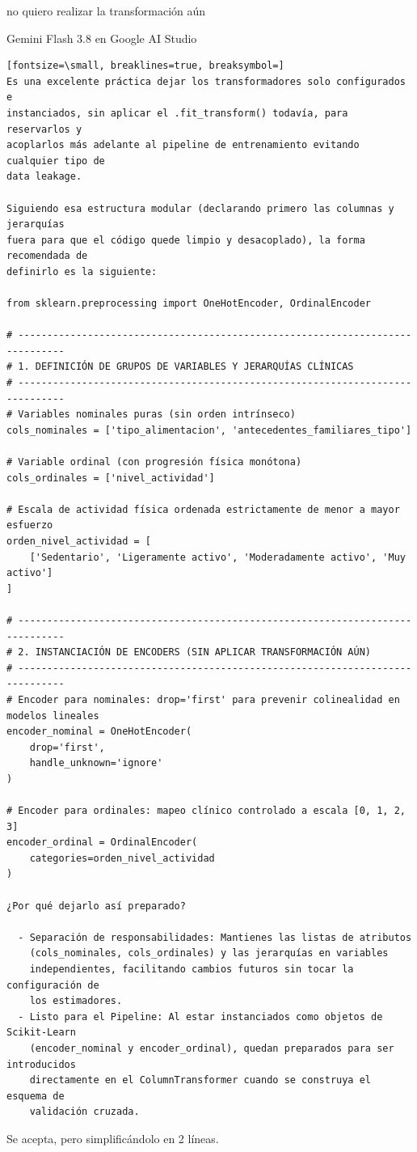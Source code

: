 \documentclass[12pt,a4paper,oneside]{book}
\begin{document}
\begin{iaprompt}
no quiero realizar la transformación aún
\end{iaprompt}
\begin{iaresp}{Gemini Flash 3.8 en Google AI Studio}
\begin{Verbatim}[fontsize=\small, breaklines=true, breaksymbol=]
Es una excelente práctica dejar los transformadores solo configurados e
instanciados, sin aplicar el .fit_transform() todavía, para reservarlos y
acoplarlos más adelante al pipeline de entrenamiento evitando cualquier tipo de
data leakage.

Siguiendo esa estructura modular (declarando primero las columnas y jerarquías
fuera para que el código quede limpio y desacoplado), la forma recomendada de
definirlo es la siguiente:

from sklearn.preprocessing import OneHotEncoder, OrdinalEncoder

# ------------------------------------------------------------------------------
# 1. DEFINICIÓN DE GRUPOS DE VARIABLES Y JERARQUÍAS CLÍNICAS
# ------------------------------------------------------------------------------
# Variables nominales puras (sin orden intrínseco)
cols_nominales = ['tipo_alimentacion', 'antecedentes_familiares_tipo']

# Variable ordinal (con progresión física monótona)
cols_ordinales = ['nivel_actividad']

# Escala de actividad física ordenada estrictamente de menor a mayor esfuerzo
orden_nivel_actividad = [
    ['Sedentario', 'Ligeramente activo', 'Moderadamente activo', 'Muy activo']
]

# ------------------------------------------------------------------------------
# 2. INSTANCIACIÓN DE ENCODERS (SIN APLICAR TRANSFORMACIÓN AÚN)
# ------------------------------------------------------------------------------
# Encoder para nominales: drop='first' para prevenir colinealidad en modelos lineales
encoder_nominal = OneHotEncoder(
    drop='first', 
    handle_unknown='ignore'
)

# Encoder para ordinales: mapeo clínico controlado a escala [0, 1, 2, 3]
encoder_ordinal = OrdinalEncoder(
    categories=orden_nivel_actividad
)

¿Por qué dejarlo así preparado?

  - Separación de responsabilidades: Mantienes las listas de atributos
    (cols_nominales, cols_ordinales) y las jerarquías en variables
    independientes, facilitando cambios futuros sin tocar la configuración de
    los estimadores.
  - Listo para el Pipeline: Al estar instanciados como objetos de Scikit-Learn
    (encoder_nominal y encoder_ordinal), quedan preparados para ser introducidos
    directamente en el ColumnTransformer cuando se construya el esquema de
    validación cruzada.
\end{Verbatim}
\end{iaresp}
\begin{iaanalisis}
Se acepta, pero simplificándolo en 2 líneas.
\end{iaanalisis}
\end{document}

